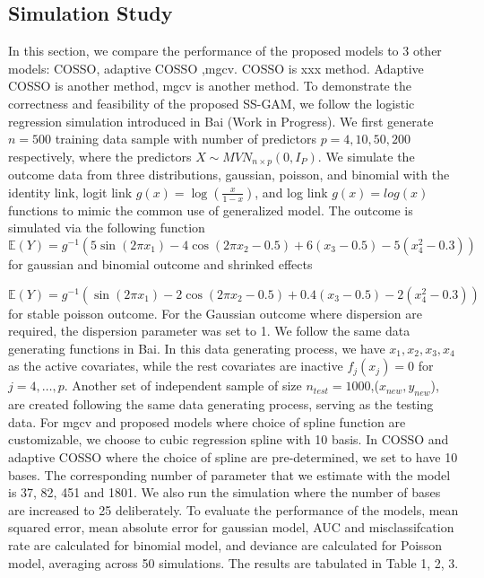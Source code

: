 \documentclass[AMA,STIX1COL,]{WileyNJD-v2}
\begin{document}
\hypertarget{simulation-study}{%
\subsection{Simulation Study}\label{simulation-study}}

In this section, we compare the performance of the proposed models to 3
other models: COSSO, adaptive COSSO ,mgcv. COSSO is xxx method. Adaptive
COSSO is another method, mgcv is another method. To demonstrate the
correctness and feasibility of the proposed SS-GAM, we follow the
logistic regression simulation introduced in Bai (Work in Progress). We
first generate \(n=500\) training data sample with number of predictors
\(p=4, 10, 50, 200\) respectively, where the predictors
\(X \sim MVN_{n\times p}(0, I_{P})\). We simulate the outcome data from
three distributions, gaussian, poisson, and binomial with the identity
link, logit link \(g(x) = \log(\frac{x}{1-x})\), and log link
\(g(x) = log(x)\) functions to mimic the common use of generalized
model. The outcome is simulated via the following function \[
\mathbb{E}(Y) = g^{-1}(5 \sin(2\pi x_1) - 4 \cos(2\pi x_2 -0.5) + 6(x_3-0.5) - 5(x_4^2 -0.3))
\] for gaussian and binomial outcome and shrinked effects

\[
\mathbb{E}(Y) = g^{-1}(\sin(2\pi x_1) - 2\cos(2\pi x_2 -0.5) + 0.4(x_3-0.5) - 2(x_4^2 -0.3))
\] for stable poisson outcome. For the Gaussian outcome where dispersion
are required, the dispersion parameter was set to 1. We follow the same
data generating functions in Bai. In this data generating process, we
have \(x_1, x_2, x_3, x_4\) as the active covariates, while the rest
covariates are inactive \(f_j(x_j) = 0\) for \(j = 4, \dots, p\).
Another set of independent sample of size
\(n_{test}=1000\),(\(x_{new} ,y_{new}\)), are created following the same
data generating process, serving as the testing data. For mgcv and
proposed models where choice of spline function are customizable, we
choose to cubic regression spline with 10 basis. In COSSO and adaptive
COSSO where the choice of spline are pre-determined, we set to have 10
bases. The corresponding number of parameter that we estimate with the
model is 37, 82, 451 and 1801. We also run the simulation where the
number of bases are increased to 25 deliberately. To evaluate the
performance of the models, mean squared error, mean absolute error for
gaussian model, AUC and misclassifcation rate are calculated for
binomial model, and deviance are calculated for Poisson model, averaging
across 50 simulations. The results are tabulated in Table 1, 2, 3.
\end{document}
